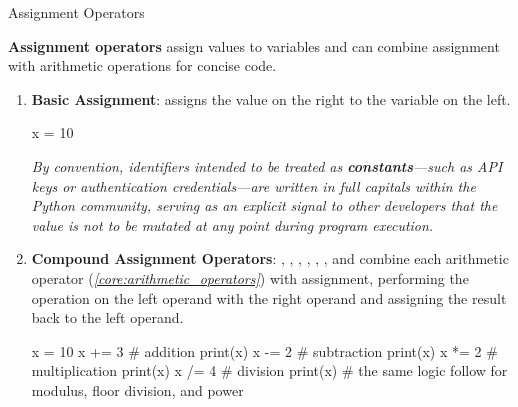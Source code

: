 \documentclass[10pt]{article}
\begin{document}
    \begin{core}{Assignment Operators}

      \textbf{Assignment operators} assign values to variables and can combine assignment with arithmetic operations for concise code.

      \begin{enumerate}

        \item \textbf{Basic Assignment}: \textcode{=} assigns the value on the right to the variable on the left.

        \begin{pyconsole}

          x = 10

        \end{pyconsole}

        \textit{By convention, identifiers intended to be treated as \textbf{constants}---such as API keys or authentication credentials---are written in full capitals within the Python community, serving as an explicit signal to other developers that the value is not to be mutated at any point during program execution.}
                
        \item \textbf{Compound Assignment Operators}: \textcode{+=}, \textcode{-=}, \textcode{*=}, \textcode{/=}, \textcode{\%=}, \textcode{//=}, and \textcode{**=} combine each arithmetic operator (\textit{\autoref{core:arithmetic_operators}}) with assignment, performing the operation on the left operand with the right operand and assigning the result back to the left operand.

        \begin{pyconsole}

          x = 10
          x += 3 # addition
          print(x)
          x -= 2 # subtraction
          print(x)
          x *= 2 # multiplication
          print(x)
          x /= 4 # division
          print(x)
          # the same logic follow for modulus, floor division, and power

        \end{pyconsole}

      \end{enumerate}

    \end{core}
\end{document}
